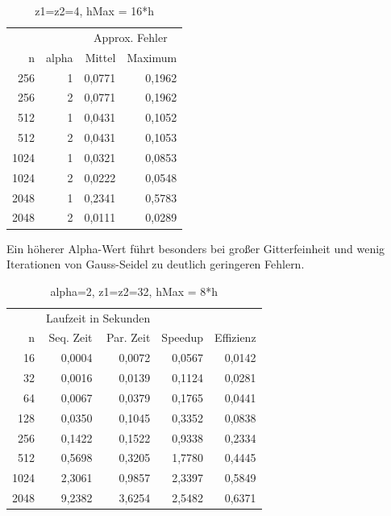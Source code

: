 \documentclass[paper = a4]{scrartcl}
\begin{document}
\begin{table}
    \centering
    \begin{tabular}{|r|r|r|r|} \hline
    & & \multicolumn{2}{c|}{Approx. Fehler} \\
    n    & alpha & Mittel & Maximum \\ \hline \hline
    256  & 1     & 0,0771 & 0,1962  \\
    256  & 2     & 0,0771 & 0,1962  \\
    512  & 1     & 0,0431 & 0,1052  \\
    512  & 2     & 0,0431 & 0,1053  \\
    1024 & 1     & 0,0321 & 0,0853  \\
    1024 & 2     & 0,0222 & 0,0548  \\
    2048 & 1     & 0,2341 & 0,5783  \\
    2048 & 2     & 0,0111 & 0,0289  \\ \hline
    \end{tabular}
    \caption{z1=z2=4, hMax = 16*h}
\end{table}

Ein höherer Alpha-Wert führt besonders bei großer Gitterfeinheit und wenig Iterationen von Gauss-Seidel zu deutlich geringeren Fehlern.

\begin{table}
    \centering
    \begin{tabular}{|r|r|r|r|r|} \hline
    & \multicolumn{2}{c|}{Laufzeit in Sekunden} & & \\
    n    & Seq. Zeit & Par. Zeit & Speedup & Effizienz \\ \hline \hline
    16   & 0,0004    & 0,0072    & 0,0567  & 0,0142    \\
    32   & 0,0016    & 0,0139    & 0,1124  & 0,0281    \\
    64   & 0,0067    & 0,0379    & 0,1765  & 0,0441    \\
    128  & 0,0350    & 0,1045    & 0,3352  & 0,0838    \\
    256  & 0,1422    & 0,1522    & 0,9338  & 0,2334    \\
    512  & 0,5698    & 0,3205    & 1,7780  & 0,4445    \\
    1024 & 2,3061    & 0,9857    & 2,3397  & 0,5849    \\
    2048 & 9,2382    & 3,6254    & 2,5482  & 0,6371    \\ \hline
    \end{tabular}
    \caption{alpha=2, z1=z2=32, hMax = 8*h}
\end{table}
\end{document}
